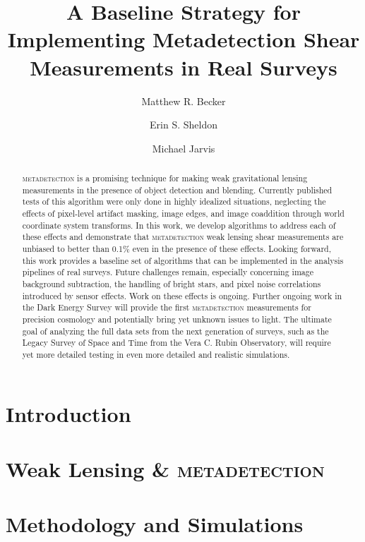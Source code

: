\documentclass[twocolappendix, appendixfloats, numberedappendix, twocolumn, apj]{openjournal}
\newcommand{\mdet}{\textsc{metadetection}\xspace}
\begin{document}
\title{A Baseline Strategy for Implementing Metadetection Shear Measurements in Real Surveys}

\author{Matthew R. Becker}
\author{Erin S. Sheldon}
\author{Michael Jarvis}


\begin{abstract}
\mdet is a promising technique for making weak gravitational lensing measurements in the presence of
object detection and blending. Currently published tests of this algorithm were only done in
highly idealized situations, neglecting the effects of pixel-level artifact masking, image edges,
and image coaddition through world coordinate system transforms. In this work, we develop algorithms
to address each of these effects and demonstrate that \mdet weak lensing shear measurements are
unbiased to better than 0.1\% even in the presence of these effects. Looking forward, this work provides
a baseline set of algorithms that can be implemented in the analysis pipelines of real surveys.
Future challenges remain, especially concerning image background subtraction, the handling of bright stars, and
pixel noise correlations introduced by sensor effects. Work on these effects is ongoing. Further
ongoing work in the Dark Energy Survey will provide the first \mdet measurements for precision
cosmology and potentially bring yet unknown issues to light. The ultimate goal of analyzing the
full data sets from the next generation of surveys, such as the Legacy Survey of Space and Time
from the Vera C. Rubin Observatory, will require yet more detailed testing in even more detailed
and realistic simulations.
\end{abstract}


\section{Introduction}\label{sec:intro}

\section{Weak Lensing \& \mdet}\label{sec:background}

\section{Methodology and Simulations}\label{sec:sims}
\end{document}
